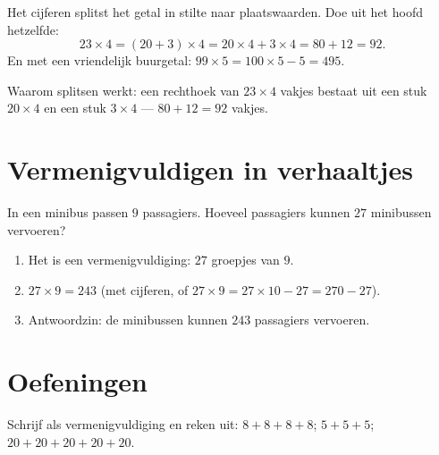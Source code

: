 \begin{example}\label{ex:g3:mult:split}
Het cijferen splitst het getal in stilte naar plaatswaarden. Doe uit het
hoofd hetzelfde:
\[
23 \times 4 = (20 + 3) \times 4 = 20 \times 4 + 3 \times 4
= 80 + 12 = 92 .
\]
En met een vriendelijk buurgetal: $99 \times 5 = 100 \times 5 - 5 =
495$.
\end{example}

\begin{omfigure}

{\small Waarom splitsen werkt: een rechthoek van $23 \times 4$ vakjes
bestaat uit een stuk $20 \times 4$ en een stuk $3 \times 4$ ---
$80 + 12 = 92$ vakjes.}
\end{omfigure}

\section{Vermenigvuldigen in verhaaltjes}

\begin{example}\label{ex:g3:mult:problem}
In een minibus passen $9$ passagiers. Hoeveel passagiers kunnen $27$
minibussen vervoeren?
\begin{enumerate}
  \item Het is een vermenigvuldiging: $27$ groepjes van $9$.
  \item $27 \times 9 = 243$ (met cijferen, of
        $27 \times 9 = 27 \times 10 - 27 = 270 - 27$).
  \item Antwoordzin: de minibussen kunnen $243$ passagiers vervoeren.
\end{enumerate}
\end{example}

\section{Oefeningen}

\begin{exercise}[$\star$]\label{exo:g3:mult:1}
Schrijf als vermenigvuldiging en reken uit:
$8 + 8 + 8 + 8$; \quad $5 + 5 + 5$; \quad
$20 + 20 + 20 + 20 + 20$.
\end{exercise}

